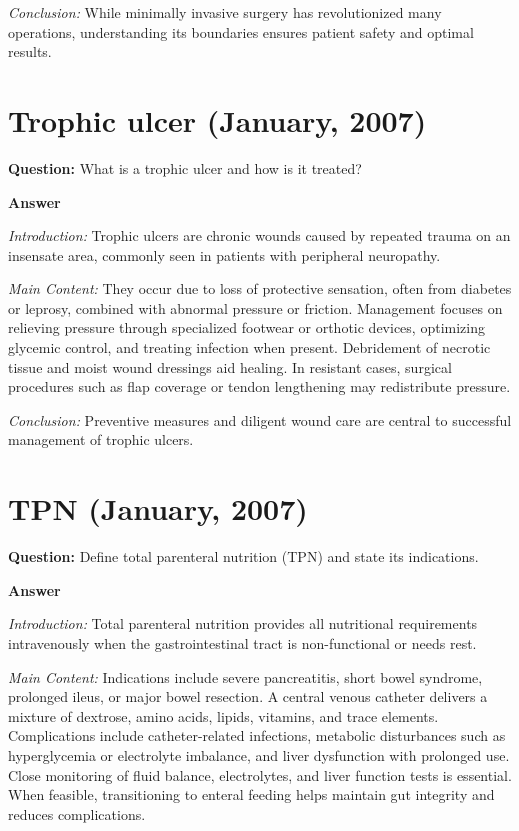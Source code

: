 \documentclass{article}
\begin{document}
\emph{Conclusion:} While minimally invasive surgery has revolutionized many operations, understanding its boundaries ensures patient safety and optimal results.


\section{Trophic ulcer (January, 2007)}


\textbf{Question:} What is a trophic ulcer and how is it treated?

\textbf{Answer}

\emph{Introduction:} Trophic ulcers are chronic wounds caused by repeated trauma on an insensate area, commonly seen in patients with peripheral neuropathy.

\emph{Main Content:} They occur due to loss of protective sensation, often from diabetes or leprosy, combined with abnormal pressure or friction. Management focuses on relieving pressure through specialized footwear or orthotic devices, optimizing glycemic control, and treating infection when present. Debridement of necrotic tissue and moist wound dressings aid healing. In resistant cases, surgical procedures such as flap coverage or tendon lengthening may redistribute pressure.

\emph{Conclusion:} Preventive measures and diligent wound care are central to successful management of trophic ulcers.


\section{TPN (January, 2007)}


\textbf{Question:} Define total parenteral nutrition (TPN) and state its indications.

\textbf{Answer}

\emph{Introduction:} Total parenteral nutrition provides all nutritional requirements intravenously when the gastrointestinal tract is non-functional or needs rest.

\emph{Main Content:} Indications include severe pancreatitis, short bowel syndrome, prolonged ileus, or major bowel resection. A central venous catheter delivers a mixture of dextrose, amino acids, lipids, vitamins, and trace elements. Complications include catheter-related infections, metabolic disturbances such as hyperglycemia or electrolyte imbalance, and liver dysfunction with prolonged use. Close monitoring of fluid balance, electrolytes, and liver function tests is essential. When feasible, transitioning to enteral feeding helps maintain gut integrity and reduces complications.
\end{document}
